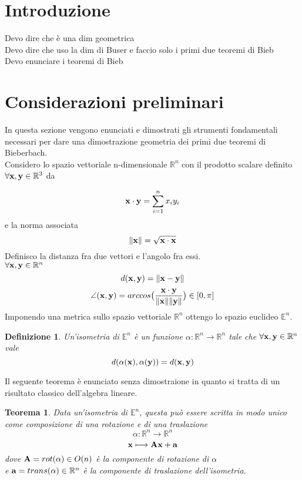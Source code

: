 \documentclass[10pt,a4paper]{article}
\author{Elisa Caruso}
\newtheorem{definition}{Definizione}[section]
\newtheorem{theorem}{Teorema}[section]
\begin{document}
 

\section{Introduzione}

Devo dire che è una dim geometrica\\
Devo dire che uso la dim di Buser e faccio solo i primi due teoremi di Bieb \\
Devo enunciare i teoremi di Bieb \\



\section{Considerazioni preliminari}
In questa sezione vengono enunciati e dimostrati gli strumenti fondamentali necessari per dare una dimostrazione geometria dei primi due teoremi di Bieberbach. \\
Considero lo spazio vettoriale n-dimensionale $\mathbb{R}^{n}$  con il prodotto scalare definito $\forall
 \vb{x} , \vb{y} \in \mathbb{R}^{3}$ da 

\[
  \vb{x} \cdot \vb{y} =  \sum_{i=1}^{n} x_i y_i 
\]
e la norma associata 
\[
  \norm{\vb{x}} =  \sqrt{\vb{x} \cdot \vb{x}}
\]
Definisco la distanza fra due vettori e l'angolo fra essi. \\
$ \forall \vb{x}, \vb{y} \in \mathbb{R}^n $  
\[ d(\vb{x}, \vb{y} ) = \norm{\vb{x-y}}\] 
\[ \angle (\vb{x},\vb{y}) = arccos \big( \frac{\vb{x} \cdot \vb{y}}{\norm{\vb{x}} \norm{\vb{y}}} \big) \in [0, \pi] \]
Imponendo una metrica sullo spazio vettoriale $\mathbb{R}^n$ ottengo lo spazio euclideo $\mathbb{E}^n$.

\begin{definition}
	Un'isometria di $\mathbb{E}^n$  è un funzione $ \alpha : \mathbb{R}^{n} \longrightarrow \mathbb{R}^{n} $  tale che $\forall \vb{x,y} \in \mathbb{R}^n $ vale 
	\[ d(\alpha(\vb{x}), \alpha(\vb{y})) = d(\vb{x} , \vb{y} )\]
\end{definition}
Il seguente teorema è enunciato senza dimostraione in quanto si tratta di un risultato classico dell'algebra lineare. 

\begin{theorem}
Data un'isometria di $\mathbb{E}^n $, questa può essere scritta in modo unico come composizione di una rotazione e di una traslazione
\[ \alpha : \mathbb{R}^{n} \longrightarrow \mathbb{R}^{n} \]
\[\vb{x} \longmapsto \vb{Ax + a} \]
dove $\vb{A} = rot( \alpha ) \in O(n) $ è la componente di rotazione di $\alpha$ \\
e $\vb{a} = trans( \alpha ) \in \mathbb{R}^{n} $ è la componente di traslazione dell'isometria. 
\end{theorem}
\end{document}
